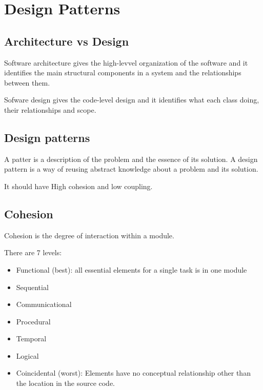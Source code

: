 \documentclass{article}
\begin{document}
    \section*{Design Patterns}
    
    \subsection*{Architecture vs Design}

    Software architecture gives the high-levvel organization of the software and it 
    identifies the main structural components in a system and the relationships between 
    them.

    Sofware design gives the code-level design and it identifies what each class doing, 
    their relationships and scope.

    \subsection*{Design patterns}

    A patter is a description of the problem and the essence of its solution. A design 
    pattern is a way of reusing abstract knowledge about a problem and its solution. 

    It should have High cohesion and low coupling.

    \subsection*{Cohesion}

    Cohesion is the degree of interaction within a module.

    There are 7 levels:
    \begin{itemize}
        \item Functional (best): all essential elements for a single task is in one module 
        \item Sequential 
        \item Communicational 
        \item Procedural 
        \item Temporal 
        \item Logical 
        \item Coincidental (worst): Elements have no conceptual relationship other than the 
        location in the source code. 
    \end{itemize}

\end{document}
